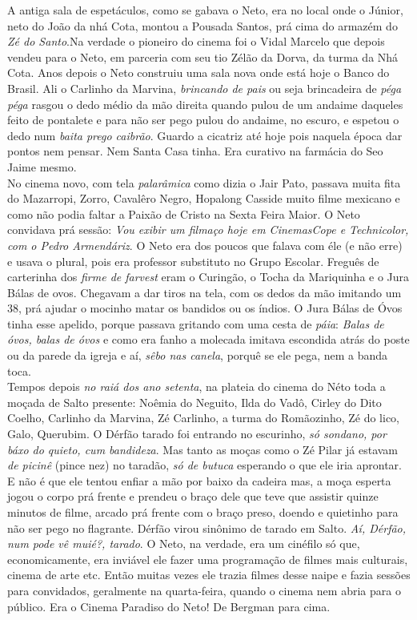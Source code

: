 \documentclass[12pt,brazil,]{book}
\begin{document}
A antiga sala de espetáculos, como se gabava o Neto, era no local onde o
Júnior, neto do João da nhá Cota, montou a Pousada Santos, prá cima do
armazém do \emph{Zé do Santo}.Na verdade o pioneiro do cinema foi o
Vidal Marcelo que depois vendeu para o Neto, em parceria com seu tio
Zélão da Dorva, da turma da Nhá Cota. Anos depois o Neto construiu uma
sala nova onde está hoje o Banco do Brasil. Ali o Carlinho da Marvina,
\emph{brincando de pais} ou seja brincadeira de \emph{péga péga} rasgou
o dedo médio da mão direita quando pulou de um andaime daqueles feito de
pontalete e para não ser pego pulou do andaime, no escuro, e espetou o
dedo num \emph{baita prego caibrão}. Guardo a cicatriz até hoje pois
naquela época dar pontos nem pensar. Nem Santa Casa tinha. Era curativo
na farmácia do Seo Jaime mesmo.\\
No cinema novo, com tela \emph{palarâmica} como dizia o Jair Pato,
passava muita fita do Mazarropi, Zorro, Cavalêro Negro, Hopalong Casside
muito filme mexicano e como não podia faltar a Paixão de Cristo na Sexta
Feira Maior. O Neto convidava prá sessão: \emph{Vou exibir um filmaço
hoje em CinemasCope e Technicolor, com o Pedro Armendáriz}. O Neto era
dos poucos que falava com éle (e não erre) e usava o plural, pois era
professor substituto no Grupo Escolar. Freguês de carterinha dos
\emph{firme de farvest} eram o Curingão, o Tocha da Mariquinha e o Jura
Bálas de ovos. Chegavam a dar tiros na tela, com os dedos da mão
imitando um 38, prá ajudar o mocinho matar os bandidos ou os índios. O
Jura Bálas de Óvos tinha esse apelido, porque passava gritando com uma
cesta de \emph{páia}: \emph{Balas de óvos, balas de óvos} e como era
fanho a molecada imitava escondida atrás do poste ou da parede da igreja
e aí, \emph{sêbo nas canela}, porquê se ele pega, nem a banda toca.\\
Tempos depois \emph{no raiá dos ano setenta}, na plateia do cinema do
Néto toda a moçada de Salto presente: Noêmia do Neguito, Ilda do Vadô,
Cirley do Dito Coelho, Carlinho da Marvina, Zé Carlinho, a turma do
Romãozinho, Zé do lico, Galo, Querubim. O Dérfão tarado foi entrando no
escurinho, \emph{só sondano, por báxo do quieto, cum bandideza}. Mas
tanto as moças como o Zé Pilar já estavam \emph{de picinê} (pince nez)
no taradão, \emph{só de butuca} esperando o que ele iria aprontar. E não
é que ele tentou enfiar a mão por baixo da cadeira mas, a moça esperta
jogou o corpo prá frente e prendeu o braço dele que teve que assistir
quinze minutos de filme, arcado prá frente com o braço preso, doendo e
quietinho para não ser pego no flagrante. Dérfão virou sinônimo de
tarado em Salto. \emph{Aí, Dérfão, num pode vê muié?, tarado}. O Neto,
na verdade, era um cinéfilo só que, economicamente, era inviável ele
fazer uma programação de filmes mais culturais, cinema de arte etc.
Então muitas vezes ele trazia filmes desse naipe e fazia sessões para
convidados, geralmente na quarta-feira, quando o cinema nem abria para o
público. Era o Cinema Paradiso do Neto! De Bergman para cima.
\end{document}
